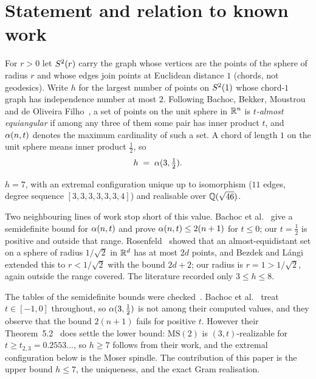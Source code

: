 \section{Statement and relation to known work}

For $r>0$ let $S^2(r)$ carry the graph whose vertices are the points of the
sphere of radius $r$ and whose edges join points at Euclidean distance $1$
(chords, not geodesics). Write $h$ for the largest number of points on $S^2(1)$
whose chord-$1$ graph has independence number at most $2$. Following Bachoc, Bekker, Moustrou and de Oliveira Filho~\cite{Bachoc2025}, a set of points on the unit sphere in
$\mathbb{R}^n$ is \emph{$t$-almost equiangular} if among any three of them some pair has
inner product $t$, and $\alpha(n,t)$ denotes the maximum cardinality of such a
set. A chord of length $1$ on the unit sphere means inner product $\tfrac12$, so
\[
h \;=\; \alpha(3,\tfrac12).
\]

\begin{theorem}
\label{thm:h7}
$h=7$, with an extremal configuration unique up to isomorphism ($11$ edges,
degree sequence $[3,3,3,3,3,3,4]$) and realisable over $\mathbb{Q}(\sqrt{46})$.
\end{theorem}

Two neighbouring lines of work stop short of this value. Bachoc et al.~\cite{Bachoc2025} give a
semidefinite bound for $\alpha(n,t)$ and prove $\alpha(n,t)\le 2(n+1)$ for
$t\le0$; our $t=\tfrac12$ is positive and outside that range. Rosenfeld~\cite{Rosenfeld1991} showed
that an almost-equidistant set on a sphere of radius $1/\sqrt2$ in $\mathbb{R}^d$ has at
most $2d$ points, and Bezdek and L\'angi~\cite{BezdekLangi} extended this to $r<1/\sqrt2$ with the
bound $2d+2$; our radius is $r=1>1/\sqrt2$, again outside the range covered. The
literature recorded only $3\le h\le8$.

\begin{remark}
The tables of the semidefinite bounds were checked~\cite{Bachoc2025}. Bachoc et al.~\cite{Bachoc2025} treat
$t\in[-1,0]$ throughout, so $\alpha(3,\tfrac12)$ is not among their computed
values, and they observe that the bound $2(n+1)$ fails for positive $t$.
However their Theorem~5.2~\cite{Bachoc2025} does settle the lower bound: $\mathrm{MS}(2)$ is
$(3,t)$-realizable for $t\ge t_{2,3}=0.2553\ldots$, so $h\ge7$ follows from
their work, and the extremal configuration below is the Moser spindle. The
contribution of this paper is the upper bound $h\le7$, the uniqueness, and the
exact Gram realisation.
\end{remark}

